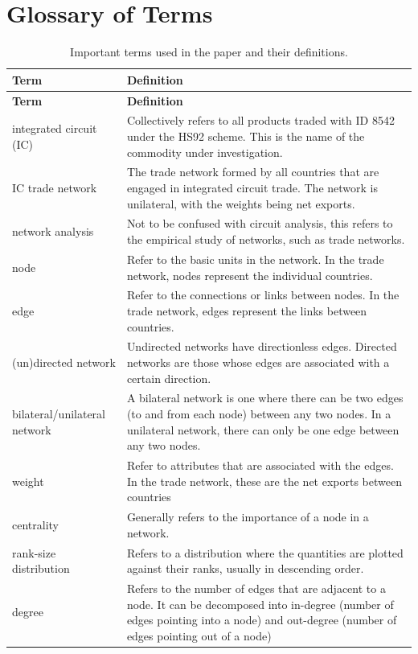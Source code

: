 \documentclass[12pt,letterpaper]{report}
\begin{document}
\section*{Glossary of Terms}
\begin{longtable}{|p{5cm}|p{8cm}|}
	\caption{Important terms used in the paper and their definitions.} \\
	\hline
	\textbf{\small Term} & \textbf{\small Definition} \\
	\hline
	\endfirsthead
	\hline
	\textbf{\small Term} & \textbf{\small Definition} \\
	\hline
	\endhead
	integrated circuit (IC) & Collectively refers to all products traded with ID 8542 under the HS92 scheme. This is the name of the commodity under investigation. \\
	\hline
	IC trade network & The trade network formed by all countries that are engaged in integrated circuit trade. The network is unilateral, with the weights being net exports. \\
	\hline
	network analysis & Not to be confused with circuit analysis, this refers to the empirical study of networks, such as trade networks. \\
	\hline
	node & Refer to the basic units in the network. In the trade network, nodes represent the individual countries. \\
	\hline
	edge & Refer to the connections or links between nodes. In the trade network, edges represent the links between countries. \\
	\hline
	(un)directed network & Undirected networks have directionless edges. Directed networks are those whose edges are associated with a certain direction. \\
	\hline
	bilateral/unilateral network & A bilateral network is one where there can be two edges (to and from each node) between any two nodes. In a unilateral network, there can only be one edge between any two nodes.  \\
	\hline
	weight & Refer to attributes that are associated with the edges. In the trade network, these are the net exports between countries \\
	\hline
	centrality & Generally refers to the importance of a node in a network. \\
	\hline
	rank-size distribution & Refers to a distribution where the quantities are plotted against their ranks, usually in descending order. \\
	\hline
	degree & Refers to the number of edges that are adjacent to a node. It can be decomposed into in-degree (number of edges pointing into a node) and out-degree (number of edges pointing out of a node) \\

\end{longtable}
\end{document}
